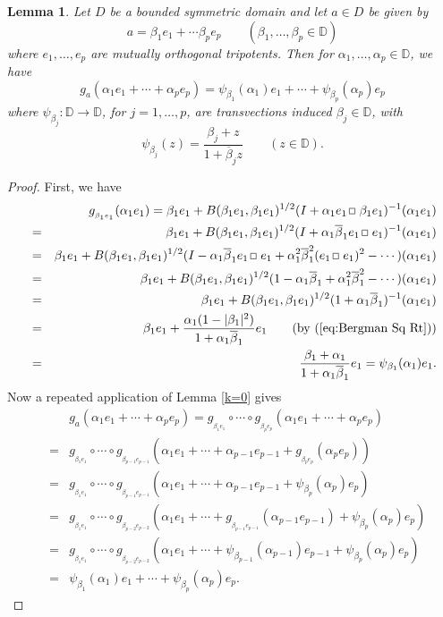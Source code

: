 \documentclass[12pt, twoside]{article}
\def\sqr#1#2{{\,\vcenter{\vbox{\hrule height.#2pt\hbox{\vrule width.#2pt
height#1pt \kern#1pt\vrule width.#2pt}\hrule height.#2pt}}\,}}
\def\bo{\sqr44\,}
\newtheorem{lemma}[theorem]{Lemma}
\theoremstyle{definition}
\numberwithin{equation}{section}
\begin{document}
\begin{lemma}\label{inc}
Let $D$ be a bounded symmetric domain and let $a\in D$ be given by
$$a = \beta_1 e_1 + \cdots \beta_p e_p \qquad (\beta_1, \ldots, \beta_p \in \mathbb{D})$$
where $e_1, \ldots, e_p$ are mutually orthogonal tripotents. Then for $\alpha_1, \ldots, \alpha_p \in \mathbb{D}$,
we have
$$g_a(\alpha_1e_1 + \cdots + \alpha_p e_p) = \psi_{\beta_1}(\alpha_1)e_1 + \cdots + \psi_{\beta_p}(\alpha_p)e_p$$
where  $\psi_{\beta_j} : \mathbb{D}\longrightarrow \mathbb{D}$, for $j=1, \ldots, p$,
are transvections induced  $\beta_j \in \mathbb{D}$, with
$$\psi_{\beta_j}(z) = \frac{\beta_j +z}{1+ \overline\beta_j z} \qquad (z\in \mathbb{D}).$$
\end{lemma}
\begin{proof} First, we have
\begin{eqnarray*}
&&g_{_{\beta_1 e_1}}(\alpha_1 e_1)  =  \beta_1 e_1
+ B(\beta_1 e_1 , \beta_1 e_1 )^{1/2}(I + \alpha_1 e_1 \bo \beta_1 e_1)^{-1}(\alpha_1 e_1)\\
&=& \beta_1 e_1
+ B(\beta_1 e_1 , \beta_1 e_1 )^{1/2}(I +\alpha_1 \overline \beta_1 e_1\bo e_1)^{-1}(\alpha_1 e_1)\\
&=& \beta_1 e_1 + B(\beta_1 e_1 , \beta_1 e_1 )^{1/2}(I -  \alpha_1\overline\beta_1  e_1 \bo e_1
+ \alpha_1^2 \overline\beta_1^2 (e_1 \bo e_1)^2 - \cdots)(\alpha_1 e_1)\\
&=&\beta_1 e_1 + B(\beta_1 e_1 , \beta_1 e_1 )^{1/2}(1 -  \alpha_1\overline\beta_1
+ \alpha_1^2 \overline\beta_1^2 - \cdots)(\alpha_1 e_1)\\
&=& \beta_1 e_1 + B(\beta_1 e_1 , \beta_1 e_1 )^{1/2}(1 + \alpha_1\overline\beta_1)^{-1}(\alpha_1 e_1)\\
&=& \beta_1 e_1 + \frac{\alpha_1(1-|\beta_1|^2)}{1 + \alpha_1\overline\beta_1}e_1 \qquad ({\rm by}~ (\ref{eq:Bergman Sq Rt}))\\
&=&  \frac{\beta_1+\alpha_1}{1 + \alpha_1\overline\beta_1}e_1
=  \psi_{\beta_1}(\alpha_1) e_1.
\end{eqnarray*}
Now a repeated application of Lemma \ref{k=0} gives
\begin{eqnarray*}
&&g_a(\alpha_1e_1 + \cdots + \alpha_p e_p)
= g_{_{\beta_1 e_1}} \circ \cdots\circ g_{_{\beta_p e_p}}(\alpha_1e_1 + \cdots + \alpha_p e_p)\\
&=& g_{_{\beta_1 e_1}} \circ \cdots\circ g_{_{\beta_{p-1} e_{p-1}}}(\alpha_1e_1 + \cdots + \alpha_{p-1}e_{p-1}+
g_{_{\beta_p e_p}}(\alpha_p e_p))\\
&=&g_{_{\beta_1 e_1}} \circ \cdots\circ g_{_{\beta_{p-1} e_{p-1}}}(\alpha_1e_1 + \cdots + \alpha_{p-1}e_{p-1}+
\psi_{\beta_p }(\alpha_p) e_p)\\
&=&g_{_{\beta_1 e_1}} \circ \cdots\circ g_{_{\beta_{p-2} e_{p-2}}}(\alpha_1e_1 + \cdots + g_{_{\beta_{p-1}e_{p-1}}}(\alpha_{p-1}e_{p-1})+
\psi_{\beta_p }(\alpha_p) e_p)\\
&=& g_{_{\beta_1 e_1}} \circ \cdots \circ g_{_{\beta_{p-2} e_{p-2}}}(\alpha_1e_1 + \cdots + \psi_{\beta_{p-1}}(\alpha_{p-1})e_{p-1}+
\psi_{\beta_p }(\alpha_p) e_p)\\
&=& \psi_{\beta_1}(\alpha_1)e_1 + \cdots + \psi_{\beta_p}(\alpha_p)e_p.
\end{eqnarray*}
\end{proof}
\end{document}
